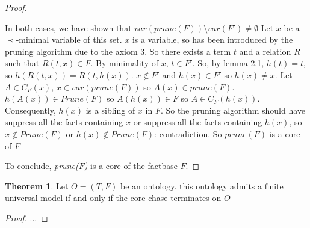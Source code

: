 \documentclass{article}
\theoremstyle{definition}
\newtheorem{theorem}{Theorem}[section]
\theoremstyle{remark}
\begin{document}
\begin{proof}
\begin{itemize}
\begin{itemize}
\end{itemize}
In both cases, we have shown that $var(prune(F))\setminus var(F') \neq \emptyset$ Let $x$ be a $\prec$-minimal variable of this set. $x$ is a variable, so has been introduced by the pruning algorithm due to the axiom 3. So there exists a term $t$ and a relation $R$ such that $R(t,x) \in F$. By minimality of $x$, $t \in F'$. So, by lemma 2.1, $h(t) = t$, so $h(R(t,x)) = R(t,h(x))$. $x \notin F'$ and $h(x) \in F'$ so $h(x) \neq x$. Let $A \in C_{F}(x)$, $x \in var(prune(F))$ so $A(x) \in prune(F)$. $h(A(x)) \in Prune(F)$ so $A(h(x)) \in F$ so $A \in C_F(h(x))$. Consequently, $h(x)$ is a sibling of $x$ in $F$. So the pruning algorithm should have suppress all the facts containing $x$ or suppress all the facts containing $h(x)$, so $x \notin Prune(F)$ or $h(x) \notin Prune(F)$: contradiction. So $prune(F)$ is a core of $F$
\end{itemize}
To conclude, \emph{prune($F$)} is a core of the factbase $F$.
\end{proof}

\begin{theorem} 
Let $O = (T,F)$ be an ontology. this ontology admits a finite universal model if and only if the core chase terminates on $O$
\end{theorem}

\begin{proof}
...
\end{proof}




\end{document}
